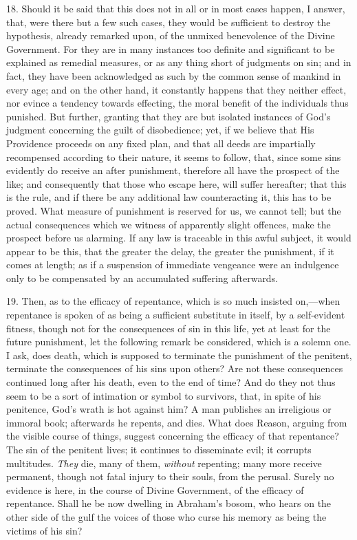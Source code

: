 18. Should it be said that this does not in all or in most cases
happen, I answer, that, were there but a few such cases, they would be
sufficient to destroy the hypothesis, already remarked upon, of the
unmixed benevolence of the Divine Government. For they are in many
instances too definite and significant to be explained as remedial
measures, or as any thing short of judgments on sin; and in fact, they
have been acknowledged as such by the common sense of mankind in every
age; and on the other hand, it constantly happens that they neither
effect, nor evince a tendency towards effecting, the moral benefit of
the individuals thus punished. But further, granting that they are but
isolated instances of God's judgment concerning the guilt of
disobedience; yet, if we believe that His Providence proceeds on any
fixed plan, and that all deeds are impartially recompensed according
to their nature, it seems to follow, that, since some sins evidently
do receive an after punishment, therefore all have the prospect of the
like; and consequently that those who escape here, will suffer
hereafter; that this is the rule, and if there be any additional law
counteracting it, this has to be proved. What measure of punishment is
reserved for us, we cannot tell; but the actual consequences which we
witness of apparently slight offences, make the prospect before us
alarming. If any law is traceable in this awful subject, it would
appear to be this, that the greater the delay, the greater the
punishment, if it comes at length; as if a suspension of immediate
vengeance were an indulgence only to be compensated by an accumulated
suffering afterwards.

19. Then, as to the efficacy of repentance, which is so much
insisted on,—when repentance is spoken of as being a sufficient
substitute in itself, by a self-evident fitness, though not for the
consequences of sin in this life, yet at least for the future
punishment, let the following remark be considered, which is a solemn
one. I ask, does death, which is supposed to terminate the punishment
of the penitent, terminate the consequences of his sins upon others?
Are not these consequences continued long after his death, even to the
end of time? And do they not thus seem to be a sort of intimation or
symbol to survivors, that, in spite of his penitence, God's wrath is
hot against him? A man publishes an irreligious or immoral book;
afterwards he repents, and dies. What does Reason, arguing from the
visible course of things, suggest concerning the efficacy of that
repentance? The sin of the penitent lives; it continues to disseminate
evil; it corrupts multitudes. \emph{They} die, many of them, \emph{without}
repenting; many more receive permanent, though not fatal injury to
their souls, from the perusal. Surely no evidence is here, in the
course of Divine Government, of the efficacy of repentance. Shall he
be now dwelling in Abraham's bosom, who hears on the other side of the
gulf the voices of those who curse his memory as being the victims of
his sin?

